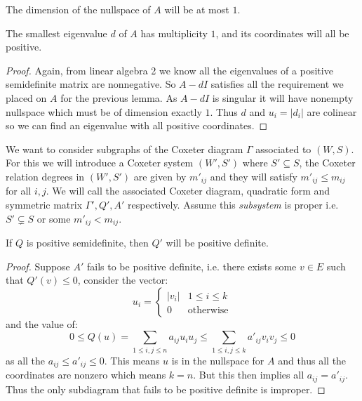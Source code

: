 \documentclass[../main.tex]{subfiles}
\begin{document}
\begin{corollary}
    The dimension of the nullspace of $A$ will be at most $1$.
\end{corollary}

\begin{lemma}
    The smallest eigenvalue $d$ of $A$ has multiplicity $1$, and its coordinates will all be positive.
    \begin{proof}
        Again, from linear algebra 2 we know all the eigenvalues of a positive semidefinite matrix are nonnegative. So $A-dI$ satisfies all the requirement we placed on $A$ for the previous lemma. As $A-dI$ is singular it will have nonempty nullspace which must be of dimension exactly $1$. Thus $d$ and $u_i = |d_i|$ are colinear so we can find an eigenvalue with all positive coordinates.
    \end{proof}
\end{lemma}

We want to consider subgraphs of the Coxeter diagram $\Gamma$ associated to $(W,S)$. For this we will introduce a Coxeter system $(W',S')$ where $S'\subseteq S$, the Coxeter relation degrees in $(W',S')$ are given by $m'_{ij}$ and they will satisfy $m'_{ij}\leq m_{ij}$ for all $i,j$. We will call the associated Coxeter diagram, quadratic form and symmetric matrix $\Gamma', Q', A'$ respectively. Assume this \textit{subsystem} is proper i.e. $S'\subsetneq S$ or some $m'_{ij}<m_{ij}$.

\begin{proposition}
    If $Q$ is positive semidefinite, then $Q'$ will be positive definite.
    \begin{proof}
        Suppose $A'$ fails to be positive definite, i.e. there exists some $v\in E$ such that $Q'(v)\leq 0$, consider the vector:\[
            u_i = \begin{cases}
                |v_i| & 1\leq i \leq k\\
                0 & \text{otherwise}
            \end{cases}
        \] and the value of: \[
        0\leq Q(u) = \sum_{1\leq i,j\leq n} a_{ij}u_i u_j \leq \sum_{1\leq i,j\leq k} a'_{ij}v_i v_j \leq 0
        \] as all the $a_{ij}\leq a'_{ij}\leq 0$. This means $u$ is in the nullspace for $A$ and thus all the coordinates are nonzero which means $k=n$. But this then implies all $a_{ij} = a'_{ij}$. Thus the only subdiagram that fails to be positive definite is improper.
    \end{proof}
\end{proposition}
\end{document}
